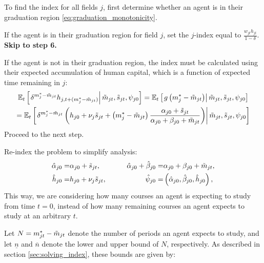 \begin{outline}

\item To find the index for all fields $j$, first determine whether an agent is in their graduation region \eqref{eq:graduation_monotonicity}. 

\begin{outline}
    \item If the agent is in their graduation region for field $j$, set the $j$-index equal to $\frac{w_{jt} h_{jt}}{1 - \delta}$. \textbf{Skip to step 6.}

    \item If the agent is not in their graduation region, the index must be calculated using their expected accumulation of human capital, which is a function of expected time remaining in $j$:
\begin{multline*}
    \mathbb{E}_t \left[\left. 
        \delta^{m_j^* - \tilde{m}_{jt}}
        h_{j,t + (m_j^* - \tilde{m}_{jt})}
     \right\vert \tilde{m}_{jt}, \tilde{s}_{jt}, \psi_{j0} \right]
    = 
    \mathbb{E}_t 
    \left[\left. 
        g\left( m_j^* - \tilde{m}_{jt} \right)
     \right\vert \tilde{m}_{jt}, \tilde{s}_{jt}, \psi_{j0} \right]
    \\
    =
    \mathbb{E}_t 
    \left[\left. 
        \delta^{m_j^* - \tilde{m}_{jt}}
        \left( 
            h_{j0} + \nu_j \tilde{s}_{j t}
            + \left( m_j^* - \tilde{m}_{jt} \right)
            \frac{\alpha_{j0} + \tilde{s}_{jt}}{\alpha_{j0} + \beta_{j0} + \tilde{m}_{jt}}
         \right)
     \right\vert \tilde{m}_{jt}, \tilde{s}_{jt}, \psi_{j0} \right]
\end{multline*}
    Proceed to the next step.
\end{outline}

\item Re-index the problem to simplify analysis:
\begin{alignat*}{3}
    \hat{\alpha}_{j0} =& \alpha_{j0} + \tilde{s}_{jt},
    \quad \quad
    &\hat{\alpha}_{j0} + \hat{\beta}_{j0} 
    =& \alpha_{j0} + \beta_{j0} + \tilde{m}_{jt},
    \\
    \hat{h}_{j0} 
    =& h_{j0} + \nu_j \tilde{s}_{jt}, 
    \quad \quad
    &\hat{\psi}_{j0} 
    =& 
    \left( \hat{\alpha}_{j0}, \hat{\beta}_{j0}, \hat{h}_{j0} \right),
\end{alignat*}
This way, we are considering how many courses an agent is expecting to study from time $t=0$, instead of how many remaining courses an agent expects to study at an arbitrary $t$.

\item Let $N = m_{jt}^* - \tilde{m}_{jt}$ denote the number of periods an agent expects to study, and let $\underline{n}$ and $\overline{n}$ denote the lower and upper bound of $N$, respectively. As described in section \ref{sec:solving_index}, these bounds are given by:


\end{outline}
